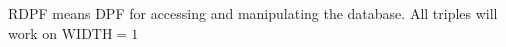 \label{sub:RDPFTriples}
RDPF means DPF for accessing and manipulating the database.
All triples will work on $\text{WIDTH} = 1$